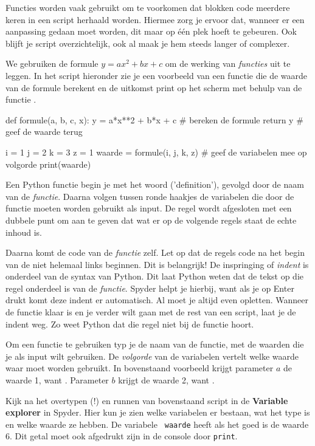 \documentclass[a4paper,11pt, fleqn]{article}
\begin{document}
Functies worden vaak gebruikt om te voorkomen dat blokken code meerdere keren in een script herhaald worden. 
Hiermee zorg je ervoor dat, wanneer er een aanpassing gedaan moet worden, dit maar op \'e\'en plek hoeft te gebeuren. 
Ook blijft je script overzichtelijk, ook al maak je hem steeds langer of complexer. 

We gebruiken de formule $y = a x^2+b x + c$ om de werking van \textit{functies} uit te leggen. In het script hieronder zie je een voorbeeld van een functie die de waarde van de formule berekent en de uitkomst print op het scherm met behulp van de functie .

\begin{python}
def formule(a, b, c, x):
    y = a*x**2 + b*x + c   # bereken de formule
    return y               # geef de waarde terug

i = 1
j = 2
k = 3
z = 1
waarde = formule(i, j, k, z) # geef de variabelen mee op volgorde
print(waarde)
\end{python} 

Een Python functie begin je met het woord  ('definition'), gevolgd door de naam van de \textit{functie}. Daarna volgen tussen ronde haakjes de variabelen die door de functie moeten worden gebruikt als input. De regel wordt afgesloten met een dubbele punt om aan te geven dat wat er op de volgende regels staat de echte inhoud is. 

Daarna komt de code van de \textit{functie} zelf. Let op dat de regels code na het begin van de  niet helemaal links beginnen. Dit is belangrijk! De inspringing of \textit{indent} is onderdeel van de syntax van Python. Dit laat Python weten dat de tekst op die regel onderdeel is van de \textit{functie}. Spyder helpt je hierbij, want als je op Enter drukt komt deze indent er automatisch. Al moet je altijd even opletten. Wanneer de functie klaar is en je verder wilt gaan met de rest van een script, laat je de indent weg. Zo weet Python dat die regel niet bij de functie hoort.

Om een functie te gebruiken typ je de naam van de functie, met de waarden die je als input wilt gebruiken. De \textit{volgorde} van de variabelen vertelt welke waarde waar moet worden gebruikt. 
In bovenstaand voorbeeld krijgt parameter $a$ de waarde 1, want . Parameter $b$ krijgt de waarde 2, want .

Kijk na het overtypen (!) en runnen van bovenstaand script in de \textbf{Variable explorer} in Spyder. Hier kun je zien welke variabelen er bestaan, wat het type is en welke waarde ze hebben. De variabele \verb, waarde, heeft als het goed is de waarde 6. Dit getal moet ook afgedrukt zijn in de console door \verb,print,.
\end{document}
